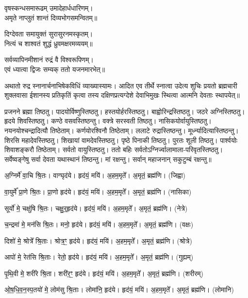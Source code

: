 वृषस्कन्धसमारूढम् उमादेहार्धधारिणम्।\\
अमृते  नाप्लुतं शान्तं दिव्यभोगसमन्वितम्॥

दिग्देवता समायुक्तं सुरासुरनमस्कृतम्।\\
नित्यं च शाश्वतं शुद्धं ध्रुवमक्षरमव्ययम्॥

सर्वव्यापिनमीशानं रुद्रं वै विश्वरूपिणम्।\\
एवं ध्यात्वा द्विजः सम्यक् ततो यजनमारभेत्॥

अथातो रुद्र स्नानार्चनाभिषेकविधिं व्याख्यास्यामः। आदित एव तीर्थे स्नात्वा उदेत्य शुचिः
प्रयतो ब्रह्मचारी शुक्लवासा ईशानस्य प्रतिकृतिं कृत्वा तस्य दक्षिणप्रत्यग्देशे देवाभिमुखः स्थित्वा आत्मनि देवताः स्थापयेत्॥

प्रजनने ब्रह्मा तिष्ठतु। पादयोर्विष्णुस्तिष्ठतु। 
हस्तयोर्हरस्तिष्ठतु। बाह्वोरिन्द्रस्तिष्ठतु। 
जठरे अग्निस्तिष्ठतु। हृदये शिवस्तिष्ठतु। 
कण्ठे वसवस्तिष्ठन्तु। वक्त्रे सरस्वती तिष्ठतु। 
नासिकयोर्\-वायुस्तिष्ठतु। नयनयोश्चन्द्रादित्यौ तिष्ठेताम्। 
कर्णयोरश्विनौ तिष्ठेताम्। ललाटे रुद्रास्तिष्ठन्तु। 
मूर्ध्न्यादित्यास्तिष्ठन्तु। शिरसि महादेवस्तिष्ठतु। 
शिखायां वामदेवस्तिष्ठतु। पृष्ठे पिनाकी तिष्ठतु। 
पुरतः शूली तिष्ठतु। पार्श्वयोः शिवाशङ्करौ तिष्ठेताम्। 
सर्वतो वायुस्तिष्ठतु। ततो बहिः सर्वतोऽग्निर्ज्वालामाला-परिवृतस्तिष्ठतु।
सर्वेष्वङ्गेषु सर्वा देवता यथास्थानं तिष्ठन्तु। मां रक्षन्तु।
\lbrack सर्वान् महाजनान् सकुटुम्बं रक्षन्तु॥\rbrack

अ॒ग्निर्मे॑ वा॒चि श्रि॒तः।   वाग्घृद॑ये।   हृद॑यं॒ मयि॑।   अ॒हम॒मृते᳚।   अ॒मृतं॒ ब्रह्म॑णि। (जिह्वा)

 वा॒युर्मे᳚ प्रा॒णे श्रि॒तः।   प्रा॒णो हृद॑ये।   हृद॑यं॒ मयि॑।   अ॒हम॒मृते᳚।   अ॒मृतं॒ ब्रह्म॑णि। (नासिका)

   सूर्यो॑ मे॒ चक्षु॑षि श्रि॒तः।   चक्षु॒र्‌॒हृद॑ये।   हृद॑यं॒ मयि॑।   अ॒हम॒मृते᳚।   अ॒मृतं॒ ब्रह्म॑णि। (नेत्रे)

   च॒न्द्रमा॑ मे॒ मन॑सि श्रि॒तः।   मनो॒ हृद॑ये।   हृद॑यं॒ मयि॑।   अ॒हम॒मृते᳚।   अ॒मृतं॒ ब्रह्म॑णि। (वक्षः)

   दिशो॑ मे॒ श्रोत्रे᳚ श्रि॒ताः।   श्रोत्र॒ꣳ॒ हृद॑ये।   हृद॑यं॒ मयि॑।   अ॒हम॒मृते᳚।   अ॒मृतं॒ ब्रह्म॑णि। (श्रोत्रे)

   आपो॑ मे॒ रेत॑सि श्रि॒ताः।   रेतो॒ हृद॑ये।   हृद॑यं॒ मयि॑।   अ॒हम॒मृते᳚।   अ॒मृतं॒ ब्रह्म॑णि। (गुह्यम्)

   पृ॒थि॒वी मे॒ शरी॑रे श्रि॒ता।   शरी॑र॒ꣳ॒ हृद॑ये।   हृद॑यं॒ मयि॑।   अ॒हम॒मृते᳚।   अ॒मृतं॒ ब्रह्म॑णि। (शरीरम्)

   ओ॒ष॒धि॒व॒न॒स्प॒तयो॑ मे॒ लोम॑सु श्रि॒ताः।   लोमा॑नि॒ हृद॑ये।   हृद॑यं॒ मयि॑।   अ॒हम॒मृते᳚।   अ॒मृतं॒ ब्रह्म॑णि। (लोमानि)

